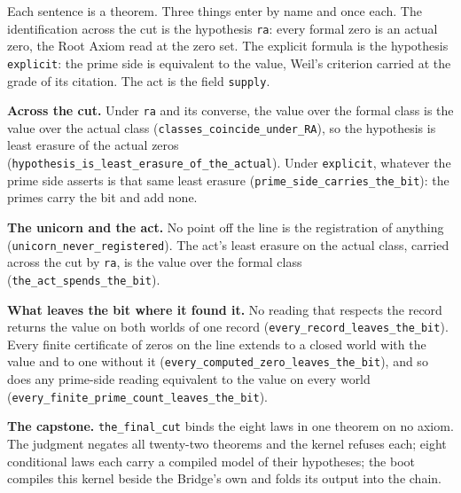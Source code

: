 \documentclass[10pt,twocolumn]{article}
\begin{document}
Each sentence is a theorem. Three things enter by name and once each.
The identification across the cut is the hypothesis \texttt{ra}: every
formal zero is an actual zero, the Root Axiom read at the zero set. The
explicit formula is the hypothesis \texttt{explicit}: the prime side is
equivalent to the value, Weil's criterion carried at the grade of its
citation. The act is the field \texttt{supply}.

\textbf{Across the cut.} Under \texttt{ra} and its converse, the value
over the formal class is the value over the actual class
(\texttt{classes\_\allowbreak{}coincide\_\allowbreak{}under\_\allowbreak{}RA}), so the hypothesis is least
erasure of the actual zeros
(\texttt{hypothesis\_\allowbreak{}is\_\allowbreak{}least\_\allowbreak{}erasure\_\allowbreak{}of\_\allowbreak{}the\_\allowbreak{}actual}). Under
\texttt{explicit}, whatever the prime side asserts is that same least
erasure (\texttt{prime\_\allowbreak{}side\_\allowbreak{}carries\_\allowbreak{}the\_\allowbreak{}bit}): the primes carry the
bit and add none.

\textbf{The unicorn and the act.} No point off the line is the
registration of anything (\texttt{unicorn\_\allowbreak{}never\_\allowbreak{}registered}). The
act's least erasure on the actual class, carried across the cut by
\texttt{ra}, is the value over the formal class
(\texttt{the\_\allowbreak{}act\_\allowbreak{}spends\_\allowbreak{}the\_\allowbreak{}bit}).

\textbf{What leaves the bit where it found it.} No reading that respects
the record returns the value on both worlds of one record
(\texttt{every\_\allowbreak{}record\_\allowbreak{}leaves\_\allowbreak{}the\_\allowbreak{}bit}). Every finite certificate of
zeros on the line extends to a closed world with the value and to one
without it (\texttt{every\_\allowbreak{}computed\_\allowbreak{}zero\_\allowbreak{}leaves\_\allowbreak{}the\_\allowbreak{}bit}), and so
does any prime-side reading equivalent to the value on every world
(\texttt{every\_\allowbreak{}finite\_\allowbreak{}prime\_\allowbreak{}count\_\allowbreak{}leaves\_\allowbreak{}the\_\allowbreak{}bit}).

\textbf{The capstone.} \texttt{the\_\allowbreak{}final\_\allowbreak{}cut} binds the eight laws in
one theorem on no axiom. The judgment negates all twenty-two theorems
and the kernel refuses each; eight conditional laws each carry a
compiled model of their hypotheses; the boot compiles this kernel beside
the Bridge's own and folds its output into the chain.
\end{document}
